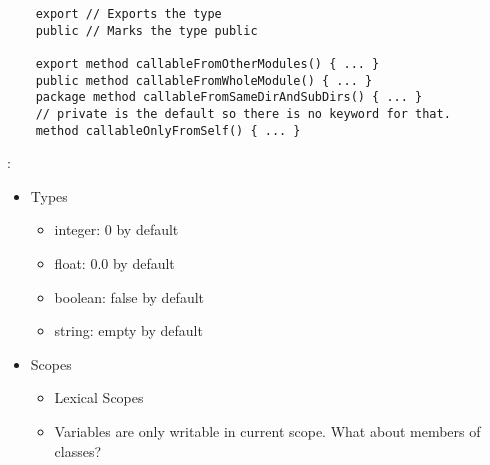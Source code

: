 \documentclass[a4paper,12pt]{report}
\begin{document}
\begin{verbatim}
    export // Exports the type
    public // Marks the type public

    export method callableFromOtherModules() { ... }
    public method callableFromWholeModule() { ... }
    package method callableFromSameDirAndSubDirs() { ... }
    // private is the default so there is no keyword for that.
    method callableOnlyFromSelf() { ... }
\end{verbatim}

:

\begin{itemize}
    \item Types
    \begin{itemize}
        \item integer: 0 by default
        \item float: 0.0 by default
        \item boolean: false by default
        \item string: empty by default
    \end{itemize} 
    \item Scopes
    \begin{itemize}
        \item Lexical Scopes
        \item Variables are only writable in current scope. What about members of classes?
    \end{itemize}
\end{itemize}

\clearpage
\end{document}
